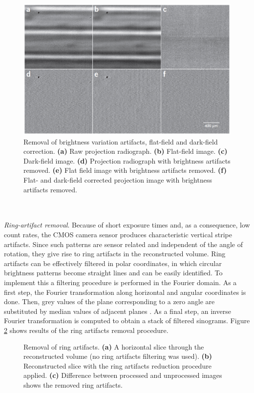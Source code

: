\begin{figure}[ht]
  \centerline{
    \includegraphics[scale = 0.55]{figures/embryo_brightness_correction.png} 
  }  
  \caption{Removal of brightness variation artifacts, flat-field and dark-field correction. \textbf{(a)} Raw projection radiograph. \textbf{(b)} Flat-field image. \textbf{(c)} Dark-field image.
\textbf{(d)} Projection radiograph with brightness artifacts removed. \textbf{(e)} Flat field image with brightness artifacts removed. \textbf{(f)} Flat- and dark-field corrected projection image with brightness artifacts removed.}
  \label{fig:embryo_brightness_correction}
\end{figure}
\\
\\
\textit{Ring-artifact removal}. Because of short exposure times and, as a consequence, low count rates, the CMOS camera sensor produces characteristic vertical stripe artifacts. Since such patterns are sensor related and independent of the angle of rotation, they give rise to ring artifacts in the reconstructed volume. Ring artifacts can be effectively filtered in polar coordinates, in which circular brightness patterns become straight lines and can be easily identified. To implement this a filtering procedure is performed in the Fourier domain. As a first step, the Fourier transformation along horizontal and angular coordinates is done. Then, grey values of the plane corresponding to a zero angle are substituted by median values of adjacent planes . As a final step, an inverse Fourier transformation is computed to obtain a stack of filtered sinograms. Figure \ref{fig:embryo_rings_removed} shows results of the ring artifacts removal procedure. 
\begin{figure}[ht]
  \centerline{
    \mbox{}
    \mbox{}
    \mbox{}
  }  
  \caption{Removal of ring artifacts. \textbf{(a)} A horizontal slice through the reconstructed volume  (no ring artifacts filtering was used). \textbf{(b)} Reconstructed slice with the ring artifacts reduction procedure applied. \textbf{(c)} Difference between processed and unprocessed images shows the removed ring artifacts.}
  \label{fig:embryo_rings_removed}
\end{figure}
